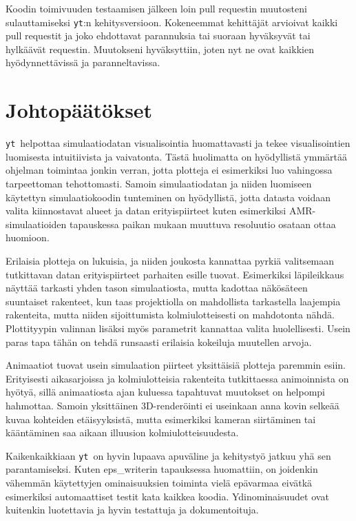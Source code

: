 \documentclass[12pt,a4paper]{article}
\newcommand{\yt}{\texttt{yt}}
\begin{document}
Koodin toimivuuden testaamisen jälkeen loin pull requestin muutosteni sulauttamiseksi \yt :n kehitysversioon. Kokeneemmat kehittäjät arvioivat kaikki pull requestit ja joko ehdottavat parannuksia tai suoraan hyväksyvät tai hylkäävät requestin. Muutokseni hyväksyttiin, joten nyt ne ovat kaikkien hyödynnettävissä ja paranneltavissa. 

\section{Johtopäätökset}
\yt\ helpottaa simulaatiodatan visualisointia huomattavasti ja tekee visualisointien luomisesta intuitiivista ja vaivatonta. Tästä huolimatta on hyödyllistä ymmärtää ohjelman toimintaa jonkin verran, jotta plotteja ei esimerkiksi luo vahingossa tarpeettoman tehottomasti. Samoin simulaatiodatan ja niiden luomiseen käytettyn simulaatiokoodin tunteminen on hyödyllistä, jotta datasta voidaan valita kiinnostavat alueet ja datan erityispiirteet kuten esimerkiksi AMR-simulaatioiden tapauskessa paikan mukaan muuttuva resoluutio osataan ottaa huomioon.

Erilaisia plotteja on lukuisia, ja niiden joukosta kannattaa pyrkiä valitsemaan tutkittavan datan erityispiirteet parhaiten esille tuovat. Esimerkiksi läpileikkaus näyttää tarkasti yhden tason simulaatiosta, mutta kadottaa näkösäteen suuntaiset rakenteet, kun taas projektiolla on mahdollista tarkastella laajempia rakenteita, mutta niiden sijoittumista kolmiulotteisesti on mahdotonta nähdä. Plottityypin valinnan lisäksi myös parametrit kannattaa valita huolellisesti. Usein paras tapa tähän on tehdä runsaasti erilaisia kokeiluja muutellen arvoja.

Animaatiot tuovat usein simulaation piirteet yksittäisiä plotteja paremmin esiin. Erityisesti aikasarjoissa ja kolmiulotteisia rakenteita tutkittaessa animoinnista on hyötyä, sillä animaatiosta ajan kuluessa tapahtuvat muutokset on helpompi hahmottaa. Samoin yksittäinen 3D-renderöinti ei useinkaan anna kovin selkeää kuvaa kohteiden etäisyyksistä, mutta esimerkiksi kameran siirtäminen tai kääntäminen saa aikaan illuusion kolmiulotteisuudesta.

Kaikenkaikkiaan \yt\ on hyvin lupaava apuväline ja kehitystyö jatkuu yhä sen parantamiseksi. Kuten {eps\_writer}in tapauksessa huomattiin, on joidenkin vähemmän käytettyjen ominaisuuksien toiminta vielä epävarmaa eivätkä esimerkiksi automaattiset testit kata kaikkea koodia. Ydinominaisuudet ovat kuitenkin luotettavia ja hyvin testattuja ja dokumentoituja. 
\end{document}
